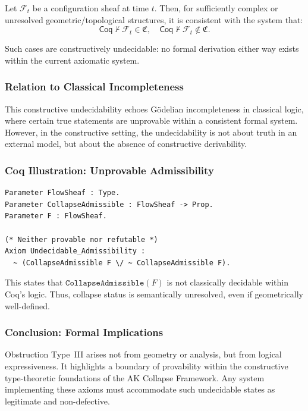 \documentclass[11pt]{article}
\begin{document}
Let \( \mathcal{F}_t \) be a configuration sheaf at time \( t \). Then, for sufficiently complex or unresolved geometric/topological structures, it is consistent with the system that:
\[
\mathsf{Coq} \nvdash \mathcal{F}_t \in \mathfrak{C}, \quad
\mathsf{Coq} \nvdash \mathcal{F}_t \notin \mathfrak{C}.
\]

Such cases are constructively undecidable: no formal derivation either way exists within the current axiomatic system.

\subsubsection*{Relation to Classical Incompleteness}

This constructive undecidability echoes Gödelian incompleteness in classical logic, where certain true statements are unprovable within a consistent formal system. However, in the constructive setting, the undecidability is not about truth in an external model, but about the absence of constructive derivability.

\subsubsection*{Coq Illustration: Unprovable Admissibility}

\begin{lstlisting}[language=Coq, caption={Coq View of Logical Undecidability}]
Parameter FlowSheaf : Type.
Parameter CollapseAdmissible : FlowSheaf -> Prop.
Parameter F : FlowSheaf.

(* Neither provable nor refutable *)
Axiom Undecidable_Admissibility :
  ~ (CollapseAdmissible F \/ ~ CollapseAdmissible F).
\end{lstlisting}

This states that \( \texttt{CollapseAdmissible}(F) \) is not classically decidable within Coq's logic. Thus, collapse status is semantically unresolved, even if geometrically well-defined.

\subsubsection*{Conclusion: Formal Implications}

Obstruction Type~III arises not from geometry or analysis, but from logical expressiveness. It highlights a boundary of provability within the constructive type-theoretic foundations of the AK Collapse Framework. Any system implementing these axioms must accommodate such undecidable states as legitimate and non-defective.
\end{document}
